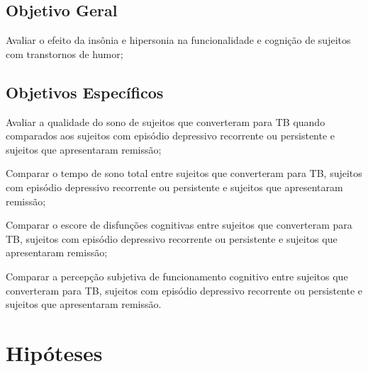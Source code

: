 \documentclass[chapter=TITLE,oneside,12pt,a4paper,english,brazil]{abntex2} %
\begin{document}
\section{Objetivo Geral}\label{sec:geral}

    \begin{alineas}

        \item Avaliar o efeito da insônia e hipersonia na funcionalidade e
        cognição de sujeitos com transtornos de humor;
    \end{alineas}

\section{Objetivos Específicos}\label{sec:especifico}

    \begin{alineas}[resume]

        \item Avaliar a qualidade do sono de sujeitos que converteram para TB
        quando comparados aos sujeitos com episódio depressivo recorrente ou
        persistente e sujeitos que apresentaram remissão;
        \item Comparar o tempo de sono total entre sujeitos que converteram para
        TB, sujeitos com episódio depressivo recorrente ou persistente e sujeitos
        que apresentaram remissão;
        \item Comparar o escore de disfunções cognitivas entre sujeitos que
        converteram para TB, sujeitos com episódio depressivo recorrente ou
        persistente e sujeitos que apresentaram remissão;
        \item Comparar a percepção subjetiva de funcionamento cognitivo entre
        sujeitos que converteram para TB, sujeitos com episódio depressivo
        recorrente ou persistente e sujeitos que apresentaram remissão.

    \end{alineas}

\vspace{\onelineskip}
\chapter{Hipóteses}\label{sec:hipoteses}
\end{document}

